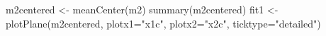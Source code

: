 \begin{Schunk}
\begin{Sinput}
 m2centered <- meanCenter(m2)
 summary(m2centered)
 fit1 <- plotPlane(m2centered, plotx1="x1c", plotx2="x2c", ticktype="detailed")
\end{Sinput}
\end{Schunk}
